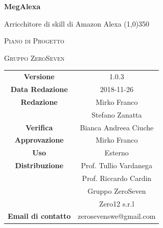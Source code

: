 \documentclass[a4paper,12pt]{book}
\author{Mirko Franco}
\date{2018-11-26}
\begin{document}
\begin{titlepage}
	\centering
	{\huge\bfseries MegAlexa\par}
	Arricchitore di skill di Amazon Alexa
	\line(1,0){350} \\
	{\scshape\LARGE Piano di Progetto \par}
	\vspace{1cm}
	{\scshape Gruppo ZeroSeven \par}
	\logo
	\begin{tabular}{c|c}
		{\hfill \textbf{Versione}} 			& 1.0.3	    \\
		{\hfill\textbf{Data Redazione}} 	& 2018-11-26		\\ 
		{\hfill\textbf{Redazione}} 			&  		Mirko Franco	\\	& Stefano Zanatta\\ 
		{\hfill\textbf{Verifica}} 				&  	Bianca Andreea Ciuche\\ 
		{\hfill\textbf{Approvazione}} 		&  		Mirko Franco			\\ 
		{\hfill\textbf{Uso}} 					& 		Esterno		\\ 
		{\hfill\textbf{Distribuzione}} 			& 			Prof. Tullio Vardanega \\ & Prof. Riccardo Cardin \\ & Gruppo ZeroSeven		\\ & Zero12 s.r.l \\ 
		{\hfill\textbf{Email di contatto}} & zerosevenswe@gmail.com \\
	\end{tabular}
\end{titlepage}
	\label{LastFrontPage}
	\newpage	
	
	\pagestyle{mymain}
	\tableofcontents
	\listoftables
	\listoffigures
	
	
	
	
	
	
	\begin{appendices}
		
	\end{appendices}
	\label{LastPage}
\end{document}

